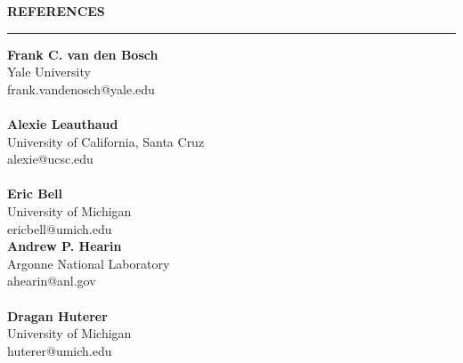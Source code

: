 \documentclass[12pt]{article}
\renewenvironment{section}[1]
  {
  \medskip
  {\color{yaleblue} \MakeUppercase{\bf #1}}
  \smallskip
  \hrule
  \medskip
  \begin{adjustwidth}{0.3cm}{}
  }
  {
  \end{adjustwidth}
  }
\newcommand{\entry}[3]{{\bf #1} \hfill {#2} \\ {#3}}
\begin{document}
\begin{section}{References}
    \begin{multicols*}{2}
    \entry{Frank C. van den Bosch}{}{Yale University\\frank.vandenosch@yale.edu} \\ \\
    \entry{Alexie Leauthaud}{}{University of California, Santa Cruz\\alexie@ucsc.edu} \\ \\
    \entry{Eric Bell}{}{University of Michigan\\ericbell@umich.edu} \columnbreak \\
    \entry{Andrew P. Hearin}{}{Argonne National Laboratory\\ahearin@anl.gov} \\ \\
    \entry{Dragan Huterer}{}{University of Michigan\\huterer@umich.edu}
    \end{multicols*}
\end{section}
\end{document}
